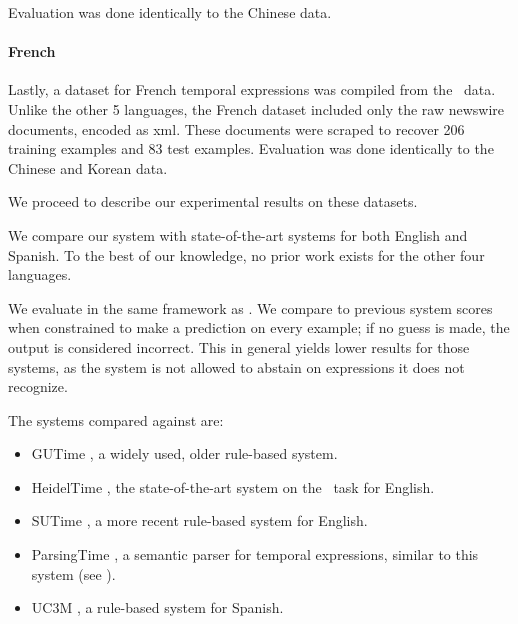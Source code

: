 Evaluation was done identically to the Chinese data.

\paragraph{French}
Lastly, a dataset for French temporal expressions was compiled from the
  \tempeval\ data.
Unlike the other 5 languages, the French dataset included only the raw newswire
  documents, encoded as xml.
These documents were scraped to recover 206 training examples and 83 test
  examples.
Evaluation was done identically to the Chinese and Korean data.

We proceed to describe our experimental results on these datasets.

We compare our system with state-of-the-art systems for both English and
  Spanish.
To the best of our knowledge, no prior work exists for the other four languages.

We evaluate in the same framework as \me.
We compare to 
	previous system scores when constrained to make a prediction on every
	example; if no guess is made, the output is considered incorrect.
This in general yields lower results for those systems,
  as the system is not allowed to
	abstain on expressions it does not recognize.

The systems compared against are:
\begin{itemize}
\item GUTime \cite{key:2010strotgen-temporal}, a widely used, older rule-based
              system.
\item HeidelTime \cite{key:2010strotgen-temporal}, the state-of-the-art
                 system on the \tempeval\ task for English.
\item SUTime \cite{key:2012chang-temporal}, a more recent rule-based
             system for English.
\item ParsingTime \mec, a semantic parser for temporal expressions, similar to
                  this system (see ).
\item UC3M \cite{2010vicente-uc3m}, a rule-based system for
             Spanish.
\end{itemize}


